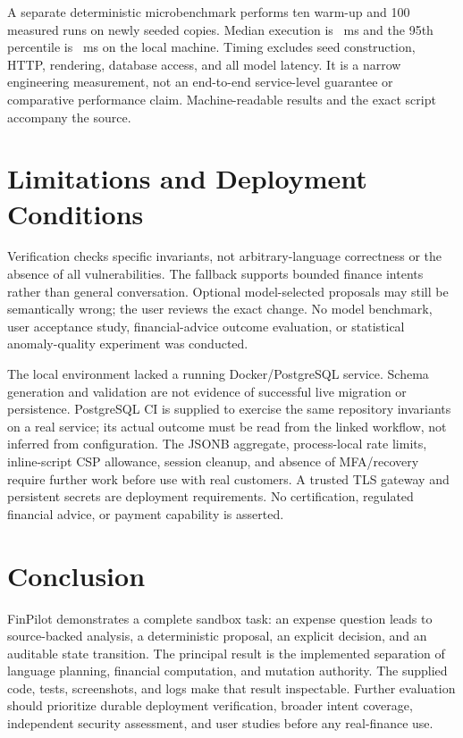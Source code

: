 \documentclass[conference,a4paper]{IEEEtran}
\begin{document}
A separate deterministic microbenchmark performs ten warm-up and 100 measured runs on newly seeded copies. Median execution is \AgentMedian{}~ms and the 95th percentile is \AgentPninetyfive{}~ms on the local machine. Timing excludes seed construction, HTTP, rendering, database access, and all model latency. It is a narrow engineering measurement, not an end-to-end service-level guarantee or comparative performance claim. Machine-readable results and the exact script accompany the source.

\section{Limitations and Deployment Conditions}
Verification checks specific invariants, not arbitrary-language correctness or the absence of all vulnerabilities. The fallback supports bounded finance intents rather than general conversation. Optional model-selected proposals may still be semantically wrong; the user reviews the exact change. No model benchmark, user acceptance study, financial-advice outcome evaluation, or statistical anomaly-quality experiment was conducted.

The local environment lacked a running Docker/PostgreSQL service. Schema generation and validation are not evidence of successful live migration or persistence. PostgreSQL CI is supplied to exercise the same repository invariants on a real service; its actual outcome must be read from the linked workflow, not inferred from configuration. The JSONB aggregate, process-local rate limits, inline-script CSP allowance, session cleanup, and absence of MFA/recovery require further work before use with real customers. A trusted TLS gateway and persistent secrets are deployment requirements. No certification, regulated financial advice, or payment capability is asserted.

\section{Conclusion}
FinPilot demonstrates a complete sandbox task: an expense question leads to source-backed analysis, a deterministic proposal, an explicit decision, and an auditable state transition. The principal result is the implemented separation of language planning, financial computation, and mutation authority. The supplied code, tests, screenshots, and logs make that result inspectable. Further evaluation should prioritize durable deployment verification, broader intent coverage, independent security assessment, and user studies before any real-finance use.
\end{document}

